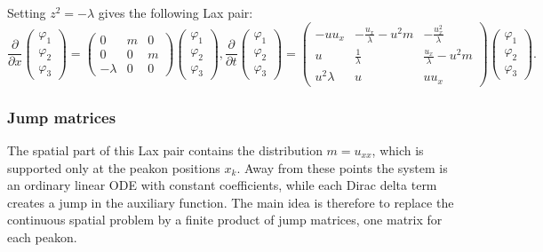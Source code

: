 \documentclass[english,master]{liumaiex}
\theoremstyle{thesisplain}
\theoremstyle{thesisdefinition}
\numberwithin{equation}{section}
\begin{document}
Setting $z^2 = -\lambda$ gives the following Lax pair:
\begin{subequations}
\begin{equation}
\frac{\partial}{\partial x}
\begin{pmatrix} \varphi_1 \\ \varphi_2 \\ \varphi_3 \end{pmatrix} =
\begin{pmatrix}
	0 & m & 0 \\
	0 & 0 & m \\
	-\lambda & 0 & 0
\end{pmatrix}
\begin{pmatrix} \varphi_1 \\ \varphi_2 \\ \varphi_3 \end{pmatrix}
,
\end{equation}
\begin{equation}
\frac{\partial}{\partial t}
\begin{pmatrix} \varphi_1 \\ \varphi_2 \\ \varphi_3 \end{pmatrix} =
\begin{pmatrix}
	-u u_x & -\frac{u_x}{\lambda}-u^2 m & -\frac{u_x^2}{\lambda} \\
	u & \frac{1}{\lambda} & \frac{u_x}{\lambda} - u^2 m \\
	u^2\lambda & u & uu_x
\end{pmatrix}
\begin{pmatrix} \varphi_1 \\ \varphi_2 \\ \varphi_3 \end{pmatrix}
.
\end{equation}
\end{subequations}
%
%
\subsubsection*{Jump matrices}

The spatial part of this Lax pair contains the distribution $m=u_{xx}$, which is supported only at the peakon positions $x_k$. Away from these points the system is an ordinary linear ODE with constant coefficients, while each Dirac delta term creates a jump in the auxiliary function. The main idea is therefore to replace the continuous spatial problem by a finite product of jump matrices, one matrix for each peakon.
\end{document}
